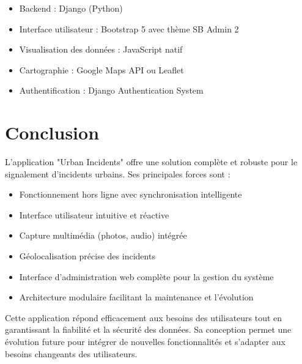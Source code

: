 \documentclass[12pt,a4paper]{article}
\begin{document}
\begin{itemize}
    \item Backend : Django (Python)
    \item Interface utilisateur : Bootstrap 5 avec thème SB Admin 2
    \item Visualisation des données : JavaScript natif
    \item Cartographie : Google Maps API ou Leaflet
    \item Authentification : Django Authentication System
\end{itemize}

\section{Conclusion}

L'application "Urban Incidents" offre une solution complète et robuste pour le signalement d'incidents urbains. Ses principales forces sont :

\begin{itemize}
    \item Fonctionnement hors ligne avec synchronisation intelligente
    \item Interface utilisateur intuitive et réactive
    \item Capture multimédia (photos, audio) intégrée
    \item Géolocalisation précise des incidents
    \item Interface d'administration web complète pour la gestion du système
    \item Architecture modulaire facilitant la maintenance et l'évolution
\end{itemize}

Cette application répond efficacement aux besoins des utilisateurs tout en garantissant la fiabilité et la sécurité des données. Sa conception permet une évolution future pour intégrer de nouvelles fonctionnalités et s'adapter aux besoins changeants des utilisateurs.
\end{document}
